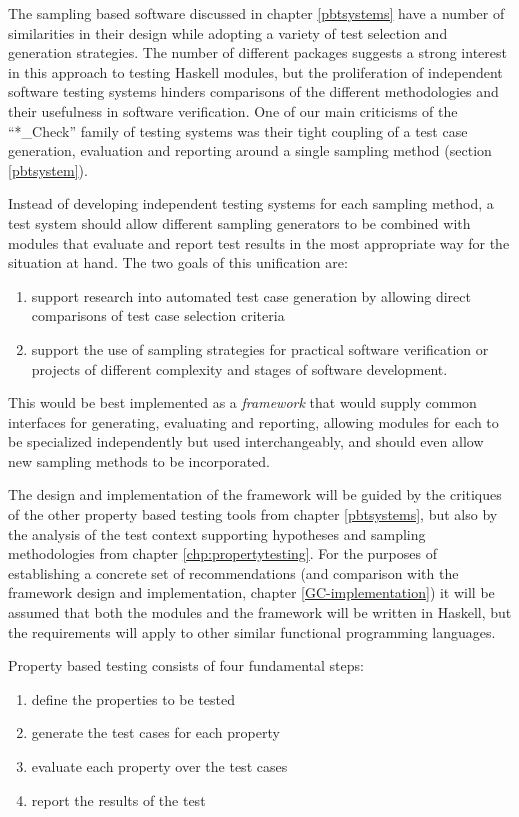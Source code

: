 The sampling based \pbt software discussed in chapter \ref{pbtsystems}
have a number of similarities in their design
while adopting a variety of test selection and generation strategies.
The number of different packages suggests 
a strong interest in this approach to testing Haskell modules,
but the proliferation of independent software testing systems 
hinders comparisons of the different methodologies and their usefulness in software verification.
One of our main criticisms of the ``*\_Check'' family of testing systems
was their tight coupling of a test case generation, evaluation and reporting
around a single sampling method (section \ref{pbtsystem}).

Instead of developing independent testing systems for each sampling method,
a test system should allow different sampling generators to be combined with
modules that evaluate and report test results in the most appropriate way for the situation at hand.
The two goals of this unification are:
\begin{enumerate}
\item support research into automated test case generation
by allowing direct comparisons of test case selection criteria
\item support the use of sampling strategies for practical software verification 
or projects of different complexity and stages of software development.
\end{enumerate}
This would be best implemented as a \emph{framework} that
would supply common interfaces for generating, evaluating and reporting,
allowing modules for each to be specialized independently but used interchangeably,
and should even allow new sampling methods to be incorporated.

The design and implementation of the framework will be guided by
the critiques of the other property based testing tools from chapter \ref{pbtsystems},
but also by the analysis of the test context supporting hypotheses and 
sampling methodologies from chapter \ref{chp:propertytesting}.
For the purposes of establishing a concrete set of recommendations
(and comparison with the \GC framework design and implementation, chapter \ref{GC-implementation})
it will be assumed that both the modules and
the framework will be written in Haskell,
but the requirements will apply to other similar functional programming languages.

Property based testing consists of four fundamental steps:
\begin{enumerate}
\item define the properties to be tested
\item generate the test cases for each property
\item evaluate each property over the test cases
\item report the results of the test
\end{enumerate}
\noindent

